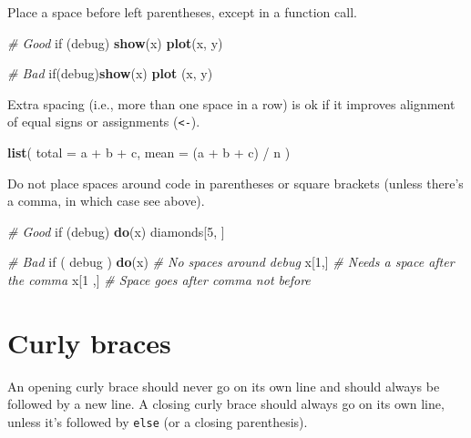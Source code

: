 \documentclass[]{book}
\newenvironment{Shaded}{\begin{snugshade}}{\end{snugshade}}
\newcommand{\KeywordTok}[1]{\textcolor[rgb]{0.13,0.29,0.53}{\textbf{{#1}}}}
\newcommand{\DataTypeTok}[1]{\textcolor[rgb]{0.13,0.29,0.53}{{#1}}}
\newcommand{\DecValTok}[1]{\textcolor[rgb]{0.00,0.00,0.81}{{#1}}}
\newcommand{\StringTok}[1]{\textcolor[rgb]{0.31,0.60,0.02}{{#1}}}
\newcommand{\CommentTok}[1]{\textcolor[rgb]{0.56,0.35,0.01}{\textit{{#1}}}}
\newcommand{\NormalTok}[1]{{#1}}
\begin{document}
Place a space before left parentheses, except in a function call.

\begin{Shaded}
\begin{Highlighting}[]
\CommentTok{# Good}
\NormalTok{if (debug) }\KeywordTok{show}\NormalTok{(x)}
\KeywordTok{plot}\NormalTok{(x, y)}

\CommentTok{# Bad}
\NormalTok{if(debug)}\KeywordTok{show}\NormalTok{(x)}
\KeywordTok{plot} \NormalTok{(x, y)}
\end{Highlighting}
\end{Shaded}

Extra spacing (i.e., more than one space in a row) is ok if it improves
alignment of equal signs or assignments (\texttt{\textless{}-}).

\begin{Shaded}
\begin{Highlighting}[]
\KeywordTok{list}\NormalTok{(}
  \DataTypeTok{total =} \NormalTok{a +}\StringTok{ }\NormalTok{b +}\StringTok{ }\NormalTok{c, }
  \DataTypeTok{mean  =} \NormalTok{(a +}\StringTok{ }\NormalTok{b +}\StringTok{ }\NormalTok{c) /}\StringTok{ }\NormalTok{n}
\NormalTok{)}
\end{Highlighting}
\end{Shaded}

Do not place spaces around code in parentheses or square brackets
(unless there's a comma, in which case see above).

\begin{Shaded}
\begin{Highlighting}[]
\CommentTok{# Good}
\NormalTok{if (debug) }\KeywordTok{do}\NormalTok{(x)}
\NormalTok{diamonds[}\DecValTok{5}\NormalTok{, ]}

\CommentTok{# Bad}
\NormalTok{if ( debug ) }\KeywordTok{do}\NormalTok{(x)  }\CommentTok{# No spaces around debug}
\NormalTok{x[}\DecValTok{1}\NormalTok{,]   }\CommentTok{# Needs a space after the comma}
\NormalTok{x[}\DecValTok{1} \NormalTok{,]  }\CommentTok{# Space goes after comma not before}
\end{Highlighting}
\end{Shaded}

\section{Curly braces}\label{curly-braces}

An opening curly brace should never go on its own line and should always
be followed by a new line. A closing curly brace should always go on its
own line, unless it's followed by \texttt{else} (or a closing
parenthesis).
\end{document}

